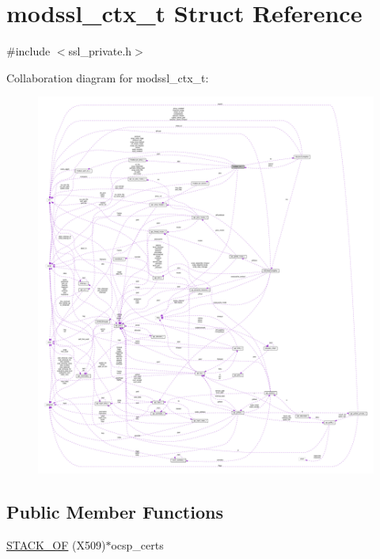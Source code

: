\hypertarget{structmodssl__ctx__t}{}\section{modssl\+\_\+ctx\+\_\+t Struct Reference}
\label{structmodssl__ctx__t}


{\ttfamily \#include $<$ssl\+\_\+private.\+h$>$}



Collaboration diagram for modssl\+\_\+ctx\+\_\+t\+:
\nopagebreak
\begin{figure}[H]
\begin{center}
\leavevmode
\includegraphics[width=350pt]{structmodssl__ctx__t__coll__graph}
\end{center}
\end{figure}
\subsection*{Public Member Functions}
\begin{DoxyCompactItemize}
\item 
\hyperlink{structmodssl__ctx__t_a67f3afc78ec7c05634d7f51fe865ff33}{S\+T\+A\+C\+K\+\_\+\+OF} (X509)$\ast$ocsp\+\_\+certs
\end{DoxyCompactItemize}
